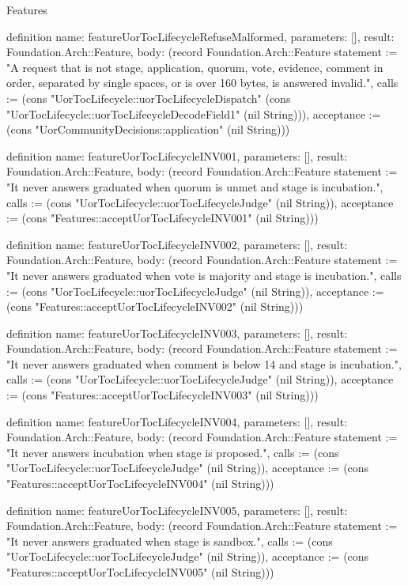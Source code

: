 \begin{lexlean}{Features}
\begin{semanticmodule}
definition{
  name: featureUorTocLifecycleRefuseMalformed,
  parameters: [],
  result: Foundation.Arch::Feature,
  body: (record Foundation.Arch::Feature {statement := "A request that is not stage, application, quorum, vote, evidence, comment in order, separated by single spaces, or is over 160 bytes, is answered invalid.", calls := (cons "UorTocLifecycle::uorTocLifecycleDispatch" (cons "UorTocLifecycle::uorTocLifecycleDecodeField1" (nil String))), acceptance := (cons "UorCommunityDecisions::application" (nil String))})
}

definition{
  name: featureUorTocLifecycleINV001,
  parameters: [],
  result: Foundation.Arch::Feature,
  body: (record Foundation.Arch::Feature {statement := "It never answers graduated when quorum is unmet and stage is incubation.", calls := (cons "UorTocLifecycle::uorTocLifecycleJudge" (nil String)), acceptance := (cons "Features::acceptUorTocLifecycleINV001" (nil String))})
}

definition{
  name: featureUorTocLifecycleINV002,
  parameters: [],
  result: Foundation.Arch::Feature,
  body: (record Foundation.Arch::Feature {statement := "It never answers graduated when vote is majority and stage is incubation.", calls := (cons "UorTocLifecycle::uorTocLifecycleJudge" (nil String)), acceptance := (cons "Features::acceptUorTocLifecycleINV002" (nil String))})
}

definition{
  name: featureUorTocLifecycleINV003,
  parameters: [],
  result: Foundation.Arch::Feature,
  body: (record Foundation.Arch::Feature {statement := "It never answers graduated when comment is below 14 and stage is incubation.", calls := (cons "UorTocLifecycle::uorTocLifecycleJudge" (nil String)), acceptance := (cons "Features::acceptUorTocLifecycleINV003" (nil String))})
}

definition{
  name: featureUorTocLifecycleINV004,
  parameters: [],
  result: Foundation.Arch::Feature,
  body: (record Foundation.Arch::Feature {statement := "It never answers incubation when stage is proposed.", calls := (cons "UorTocLifecycle::uorTocLifecycleJudge" (nil String)), acceptance := (cons "Features::acceptUorTocLifecycleINV004" (nil String))})
}

definition{
  name: featureUorTocLifecycleINV005,
  parameters: [],
  result: Foundation.Arch::Feature,
  body: (record Foundation.Arch::Feature {statement := "It never answers graduated when stage is sandbox.", calls := (cons "UorTocLifecycle::uorTocLifecycleJudge" (nil String)), acceptance := (cons "Features::acceptUorTocLifecycleINV005" (nil String))})
}


\end{semanticmodule}
\end{lexlean}
